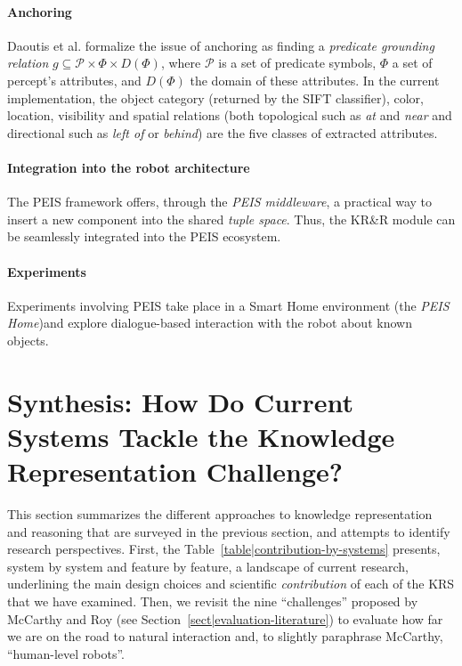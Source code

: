 \documentclass[journal]{IEEEtran}
\begin{document}
\paragraph{Anchoring} Daoutis et al. formalize the issue of anchoring as
finding a \emph{predicate grounding relation} $g \subseteq \mathcal{P} \times
\Phi \times D(\Phi)$, where $\mathcal{P}$ is a set of predicate symbols, $\Phi$
a set of percept's attributes, and $D(\Phi)$ the domain of these attributes.
% 
In the current implementation, the object category (returned by the SIFT
classifier), color, location, visibility and spatial relations (both topological 
such as \emph{at} and \emph{near} and directional such as \emph{left of} or 
\emph{behind}) are the five classes of extracted attributes.

\paragraph{Integration into the robot architecture}
\label{sect|peis-integration}

The PEIS framework offers, through the \emph{PEIS middleware}, a practical way 
to insert a new component into the shared \emph{tuple space}.  Thus, the KR\&R
module can be seamlessly integrated into the PEIS ecosystem.

\paragraph{Experiments} Experiments involving PEIS take place in a Smart Home
environment (the \emph{PEIS Home})and  explore
dialogue-based interaction with the robot about known objects.




\section{Synthesis: How Do Current Systems Tackle the Knowledge Representation
Challenge?}
\label{sect|conclusion}

This section summarizes the different approaches to knowledge representation and
reasoning that are surveyed in the previous section, and attempts to identify
research perspectives.
First, the Table~\ref{table|contribution-by-systems} presents, system by system
and feature by feature, a landscape of current research, underlining the main
design choices and scientific \emph{contribution} of each of the KRS that we
have examined.
Then, we revisit the nine ``challenges'' proposed by McCarthy and Roy (see
Section~\ref{sect|evaluation-literature}) to evaluate how far we are on the 
road to natural interaction and, to slightly paraphrase McCarthy, ``human-level
robots''.
\end{document}
